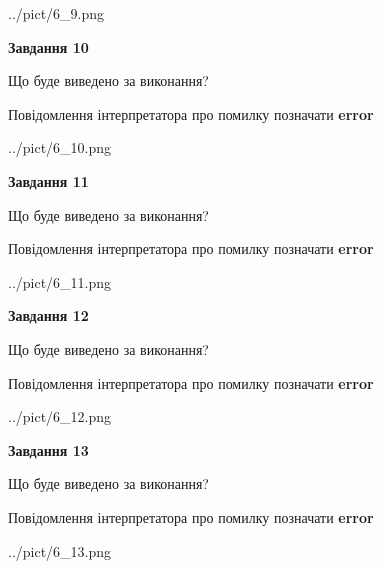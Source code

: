 \documentclass[11pt, ukrainian]{article}
\begin{document}
{\begin {large}
\begin{center}
	{../pict/6_9.png}
\end{center}
\newpage

{\begin {center}\textbf{Завдання 10}\end {center}}\par
Що буде виведено за виконання? \par
Повідомлення інтерпретатора про помилку позначати \textbf{error}

\begin{center}
	{../pict/6_10.png}
\end{center}
\newpage

{\begin {center}\textbf{Завдання 11}\end {center}}\par
Що буде виведено за виконання? \par
Повідомлення інтерпретатора про помилку позначати \textbf{error}

\begin{center}
	{../pict/6_11.png}
\end{center}
\newpage

{\begin {center}\textbf{Завдання 12}\end {center}}\par
Що буде виведено за виконання? \par
Повідомлення інтерпретатора про помилку позначати \textbf{error}

\begin{center}
	{../pict/6_12.png}
\end{center}
\newpage

{\begin {center}\textbf{Завдання 13}\end {center}}\par
Що буде виведено за виконання? \par
Повідомлення інтерпретатора про помилку позначати \textbf{error}

\begin{center}
	{../pict/6_13.png}
\end{center}
\newpage


\end{large}}
\end{document}
